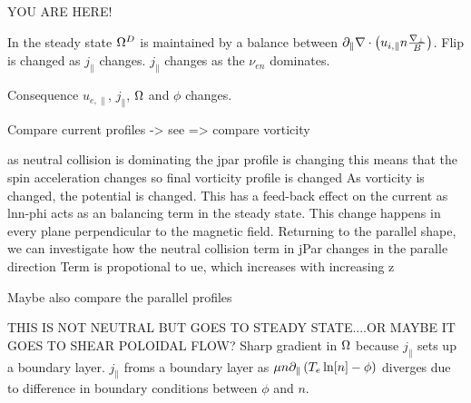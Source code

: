 YOU ARE HERE!









In the steady state $\Omega^D$ is maintained by a balance between $\partial_\|\nabla\cdot\left(u_{i,\|}n\frac{\nabla_\perp}{B}\right)$.
Flip is changed as $j_\|$ changes.
$j_\|$ changes as the $\nu_{en}$ dominates.

Consequence $u_{e,\|}$, $j_\|$, $\Omega$ and $\phi$ changes.

Compare current profiles -> see
=> compare vorticity

as neutral collision is dominating the jpar profile is changing
this means that the spin acceleration changes
so final vorticity profile is changed
As vorticity is changed, the potential is changed.
This has a feed-back effect on the current as lnn-phi acts as an balancing term in the steady state.
This change happens in every plane perpendicular to the magnetic field.
Returning to the parallel shape, we can investigate how the neutral collision term in jPar changes in the paralle direction
Term is propotional to ue, which increases with increasing z


Maybe also compare the parallel profiles

THIS IS NOT NEUTRAL BUT GOES TO STEADY STATE....OR MAYBE IT GOES TO SHEAR POLOIDAL FLOW?
Sharp gradient in $\Omega$ because $j_\|$ sets up a boundary layer.
$j_\|$ froms a boundary layer as $\mu n \partial_\|\left(T_e\ln[n]-\phi\right)$ diverges due to difference in boundary conditions between $\phi$ and $n$.








